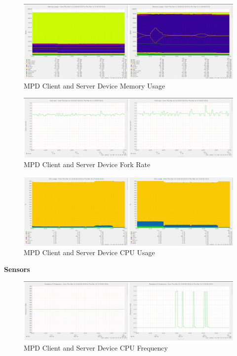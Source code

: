 \documentclass[11pt,a4paper,headinclude=false,footinclude=false]{scrreprt}
\begin{document}
\begin{figure}[H]
\includegraphics{ResultsAndAnalysis/MPDServerTestImages/016MPDMemoryUsage.png}
\centering
\caption{MPD Client and Server Device Memory Usage}
\label{MPDMemUse}
\end{figure}

\begin{figure}[H]
\includegraphics{ResultsAndAnalysis/MPDServerTestImages/012MPDForkRate.png}
\centering
\caption{MPD Client and Server Device Fork Rate}
\label{MPDForkRate}
\end{figure}

\begin{figure}[H]
\includegraphics{ResultsAndAnalysis/MPDServerTestImages/004MPDCPUUsage.png}
\centering
\caption{MPD Client and Server Device CPU Usage}
\label{MPDCPUUsage}
\end{figure}

\textbf{Sensors}

\begin{figure}[H]
\includegraphics{ResultsAndAnalysis/MPDServerTestImages/001MPDCPUFreq.png}
\centering
\caption{MPD Client and Server Device CPU Frequency}
\label{MPDCPUFreq}
\end{figure}
\end{document}
